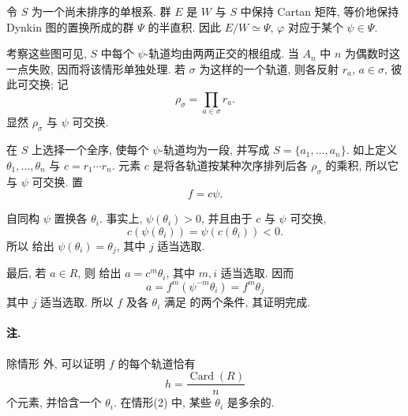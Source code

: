 令 \(S\) 为一个尚未排序的单根系. 群 \(E\) 是 \(W\) 与 \(S\) 中保持 Cartan 矩阵, 等价地保持 Dynkin 图的置换所成的群 \(\Psi\) 的半直积. 因此 \(E/W\simeq\Psi\), \(\varphi\) 对应于某个 \(\psi\in\Psi\).

考察这些图可见, \(S\) 中每个 \(\psi\)-轨道均由两两正交的根组成. 当 \(A_n\) 中 \(n\) 为偶数时这一点失败, 因而将该情形单独处理. 若 \(\sigma\) 为这样的一个轨道, 则各反射 \(r_a\), \(a\in\sigma\), 彼此可交换; 记
\[
  \rho_\sigma=\prod_{a\in\sigma}r_a.
\]
显然 \(\rho_\sigma\) 与 \(\psi\) 可交换.

在 \(S\) 上选择一个全序, 使每个 \(\psi\)-轨道均为一段, 并写成 \(S=\{a_1,\ldots,a_n\}\). 如上定义 \(\theta_1,\ldots,\theta_n\) 与 \(c=r_1\cdots r_n\). 元素 \(c\) 是将各轨道按某种次序排列后各 \(\rho_\sigma\) 的乘积, 所以它与 \(\psi\) 可交换. 置
\[
  f=c\psi.
\]

自同构 \(\psi\) 置换各 \(\theta_i\). 事实上, \(\psi(\theta_i)>0\), 并且由于 \(c\) 与 \(\psi\) 可交换,
\[
  c(\psi(\theta_i))=\psi(c(\theta_i))<0.
\]
所以\textup{} 给出 \(\psi(\theta_i)=\theta_j\), 其中 \(j\) 适当选取.

最后, 若 \(a\in R\), 则 给出 \(a=c^m\theta_i\), 其中 \(m,i\) 适当选取. 因而
\[
  a=f^m(\psi^{-m}\theta_i)=f^m\theta_j
\]
其中 \(j\) 适当选取. 所以 \(f\) 及各 \(\theta_i\) 满足 的两个条件, 其证明完成.

\paragraph{\textbf{注.}}
除情形\textup{} 外, 可以证明 \(f\) 的每个轨道恰有
\[
  h=\frac{\operatorname{Card}(R)}{n}
\]
个元素, 并恰含一个 \(\theta_i\). 在情形\textup{(2)} 中, 某些 \(\theta_i\) 是多余的.



